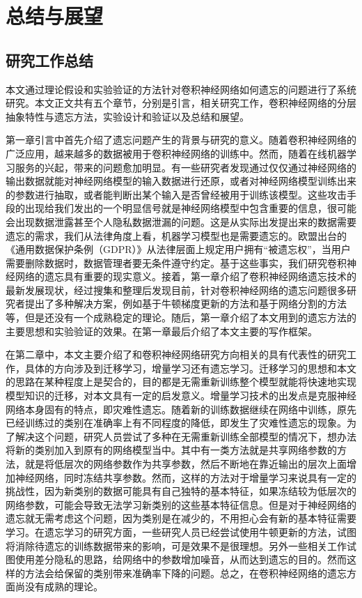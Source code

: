 
\chapter{总结与展望}

\section{研究工作总结}

本文通过理论假设和实验验证的方法针对卷积神经网络如何遗忘的问题进行了系统研究。本文正文共有五个章节，分别是引言，相关研究工作，卷积神经网络的分层抽象特性与遗忘方法，实验设计和验证以及总结和展望。

第一章引言中首先介绍了遗忘问题产生的背景与研究的意义。随着卷积神经网络的广泛应用，越来越多的数据被用于卷积神经网络的训练中。然而，随着在线机器学习服务的兴起，带来的问题愈加明显。有一些研究者发现通过仅仅通过神经网络的输出数据就能对神经网络模型的输入数据进行还原，或者对神经网络模型训练出来的参数进行抽取，或者能判断出某个输入是否曾经被用于训练该模型。这些攻击手段的出现给我们发出的一个明显信号就是神经网络模型中包含重要的信息，很可能会出现数据泄露甚至个人隐私数据泄漏的问题。这是从实际出发提出来的数据需要遗忘的需求，我们从法律角度上看，机器学习模型也是需要遗忘的。欧盟出台的《通用数据保护条例（GDPR）》从法律层面上规定用户拥有“被遗忘权”，当用户需要删除数据时，数据管理者要无条件遵守约定。基于这些事实，我们研究卷积神经网络的遗忘具有重要的现实意义。接着，第一章介绍了卷积神经网络遗忘技术的最新发展现状，经过搜集和整理后发现目前，针对卷积神经网络的遗忘问题很多研究者提出了多种解决方案，例如基于牛顿梯度更新的方法和基于网络分割的方法等，但是还没有一个成熟稳定的理论。随后，第一章介绍了本文用到的遗忘方法的主要思想和实验验证的效果。在第一章最后介绍了本文主要的写作框架。

在第二章中，本文主要介绍了和卷积神经网络研究方向相关的具有代表性的研究工作，具体的方向涉及到迁移学习，增量学习还有遗忘学习。迁移学习的思想和本文的思路在某种程度上是契合的，目的都是无需重新训练整个模型就能将快速地实现模型知识的迁移，对本文具有一定的启发意义。增量学习技术的出发点是克服神经网络本身固有的特点，即灾难性遗忘。随着新的训练数据继续在网络中训练，原先已经训练过的类别在准确率上有不同程度的降低，即发生了灾难性遗忘的现象。为了解决这个问题，研究人员尝试了多种在无需重新训练全部模型的情况下，想办法将新的类别加入到原有的网络模型当中。其中有一类方法就是共享网络参数的方法，就是将低层次的网络参数作为共享参数，然后不断地在靠近输出的层次上面增加神经网络，同时冻结共享参数。然而，这样的方法对于增量学习来说具有一定的挑战性，因为新类别的数据可能具有自己独特的基本特征，如果冻结较为低层次的网络参数，可能会导致无法学习新类别的这些基本特征信息。但是对于神经网络的遗忘就无需考虑这个问题，因为类别是在减少的，不用担心会有新的基本特征需要学习。在遗忘学习的研究方面，一些研究人员已经尝试使用牛顿更新的方法，试图将消除待遗忘的训练数据带来的影响，可是效果不是很理想。另外一些相关工作试图使用差分隐私的思路，给网络中的参数增加噪音，从而达到遗忘的目的。然而这样的方法会给保留的类别带来准确率下降的问题。总之，在卷积神经网络的遗忘方面尚没有成熟的理论。

